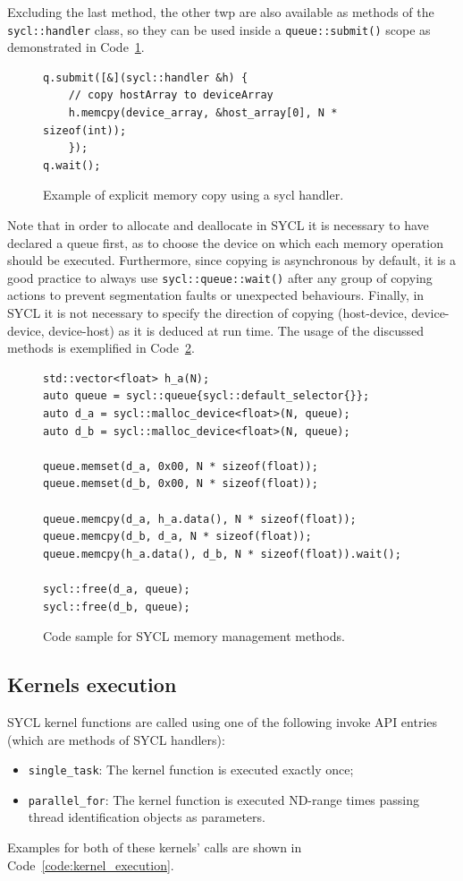 Excluding the last method, the other twp are also available as methods of the \texttt{sycl::handler} class, so they can be used inside a \texttt{queue::submit()} scope as demonstrated in Code~\ref{code:handler_copy}.


\begin{figure}[ht!]
\renewcommand{\figurename}{Code}
\begin{verbatim}
q.submit([&](sycl::handler &h) {
    // copy hostArray to deviceArray
    h.memcpy(device_array, &host_array[0], N * sizeof(int));
    });
q.wait();
\end{verbatim}
\caption{Example of explicit memory copy using a sycl handler.}
\label{code:handler_copy}
\end{figure}

Note that in order to allocate and deallocate in SYCL it is necessary to have declared a queue first, as to choose the device on which each memory operation should be executed. Furthermore, since copying is asynchronous by default, it is a good practice to always use \texttt{sycl::queue::wait()} after any group of copying actions to prevent segmentation faults or unexpected behaviours. Finally, in SYCL it is not necessary to specify the direction of copying (host-device, device-device, device-host) as it is deduced at run time. The usage of the discussed methods is exemplified in Code~\ref{code:sycl_memory}.

\begin{figure}[ht!]
\renewcommand{\figurename}{Code}
\begin{verbatim}
std::vector<float> h_a(N);
auto queue = sycl::queue{sycl::default_selector{}};
auto d_a = sycl::malloc_device<float>(N, queue);
auto d_b = sycl::malloc_device<float>(N, queue);

queue.memset(d_a, 0x00, N * sizeof(float));
queue.memset(d_b, 0x00, N * sizeof(float));

queue.memcpy(d_a, h_a.data(), N * sizeof(float));
queue.memcpy(d_b, d_a, N * sizeof(float));
queue.memcpy(h_a.data(), d_b, N * sizeof(float)).wait();

sycl::free(d_a, queue);
sycl::free(d_b, queue);
\end{verbatim}
\caption{Code sample for SYCL memory management methods.}
\label{code:sycl_memory}
\end{figure}

\subsection{Kernels execution}
\label{ch:kernels_execution}
SYCL kernel functions are called using one of the following invoke API entries (which are methods of SYCL handlers):
\begin{itemize}
    \item \texttt{single\_task}: The kernel function is executed exactly once;
    \item \texttt{parallel\_for}: The kernel function is executed ND-range times passing thread identification objects as parameters.
\end{itemize}
Examples for both of these kernels' calls are shown in Code~\ref{code:kernel_execution}.

